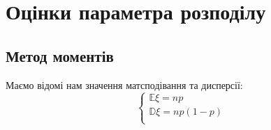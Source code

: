 \documentclass{article}
\begin{document}
\section{Оцінки параметра розподілу}
\subsection{Метод моментів}
Маємо відомі нам значення матсподівання та дисперсії:
$$
\begin{cases}
    \mathbb{E}\xi=np \\
    \mathbb{D}\xi=np(1-p)\\
\end{cases}
$$
\end{document}
